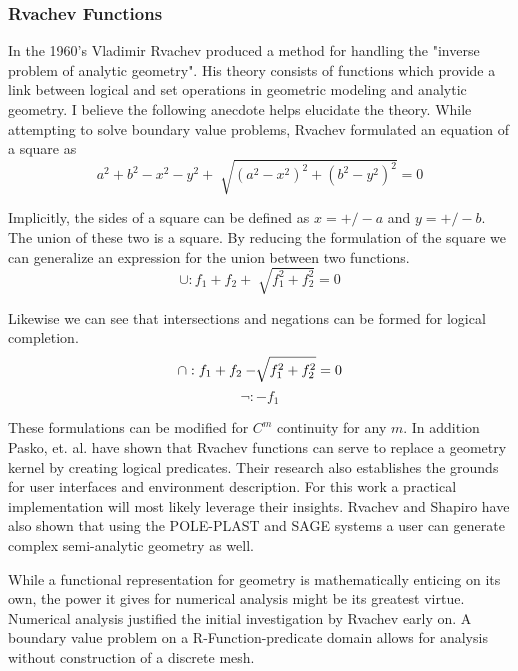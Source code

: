\subsubsection{Rvachev Functions}


In the 1960's Vladimir Rvachev produced a method for handling the "inverse
problem of analytic geometry". His theory consists of functions which provide a
link between logical and set operations in geometric modeling and analytic
geometry.\cite{shapiro1991theory} I believe the following anecdote helps
elucidate the theory. While attempting to solve boundary value problems,
Rvachev formulated an equation of a square as
\begin{equation*}
a^2 + b^2 − x^2 − y^2 + \sqrt[]{( a^2 − x^2 )^2 +( b^2 − y^2 )^2} =0
\end{equation*}

Implicitly, the sides of a square can be defined as $x= +/- a$ and $y= +/- b$.
The union of these two is a square. By reducing the formulation of the square
we can generalize an expression for the union between two functions.
\begin{equation*}
\cup : f_1 + f_2 + \sqrt[]{f_1^2 +f_2^2} =0
\end{equation*}

Likewise we can see that intersections and negations can be formed for logical
completion.
\begin{equation*}
\cap : f_1 + f_2 - \sqrt[]{f_1^2 +f_2^2} =0 \\
\end{equation*}
\begin{equation*}
\neg : -f_1
\end{equation*}

These formulations can be modified for $C^m$ continuity for any $m$.
\cite{shapiro2007semi} In addition Pasko, et. al. have shown that Rvachev
functions can serve to replace a geometry kernel by creating logical
predicates. \cite{pasko1995function} Their research also establishes the
grounds for user interfaces and environment description. For this work a
practical implementation will most likely leverage their insights.
Rvachev and Shapiro have also shown that using the POLE-PLAST and SAGE
systems a user can generate complex semi-analytic geometry
as well.\cite{rvachev2000completeness} 

While a functional representation for geometry is mathematically enticing on
its own, the power it gives for numerical analysis might be its greatest
virtue. Numerical analysis justified the initial investigation by Rvachev
early on. A boundary value problem on a R-Function-predicate domain allows
for analysis without construction of a discrete mesh.\cite{rvachev2000completeness}

